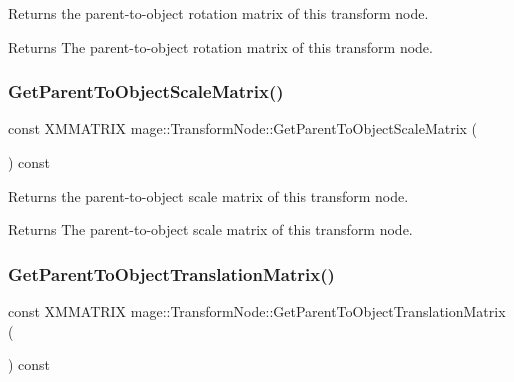 Returns the parent-\/to-\/object rotation matrix of this transform node.

\begin{DoxyReturn}{Returns}
The parent-\/to-\/object rotation matrix of this transform node. 
\end{DoxyReturn}
\hypertarget{structmage_1_1_transform_node_adad8b644fdd549028bb86f97606e2798}{}\label{structmage_1_1_transform_node_adad8b644fdd549028bb86f97606e2798} 
\subsubsection{\texorpdfstring{Get\+Parent\+To\+Object\+Scale\+Matrix()}{GetParentToObjectScaleMatrix()}}
{\footnotesize\ttfamily const X\+M\+M\+A\+T\+R\+IX mage\+::\+Transform\+Node\+::\+Get\+Parent\+To\+Object\+Scale\+Matrix (\begin{DoxyParamCaption}{ }\end{DoxyParamCaption}) const\hspace{0.3cm}{\ttfamily [noexcept]}}

Returns the parent-\/to-\/object scale matrix of this transform node.

\begin{DoxyReturn}{Returns}
The parent-\/to-\/object scale matrix of this transform node. 
\end{DoxyReturn}
\hypertarget{structmage_1_1_transform_node_a11feea92825b1b537940cd8105edd801}{}\label{structmage_1_1_transform_node_a11feea92825b1b537940cd8105edd801} 
\subsubsection{\texorpdfstring{Get\+Parent\+To\+Object\+Translation\+Matrix()}{GetParentToObjectTranslationMatrix()}}
{\footnotesize\ttfamily const X\+M\+M\+A\+T\+R\+IX mage\+::\+Transform\+Node\+::\+Get\+Parent\+To\+Object\+Translation\+Matrix (\begin{DoxyParamCaption}{ }\end{DoxyParamCaption}) const\hspace{0.3cm}{\ttfamily [noexcept]}}

